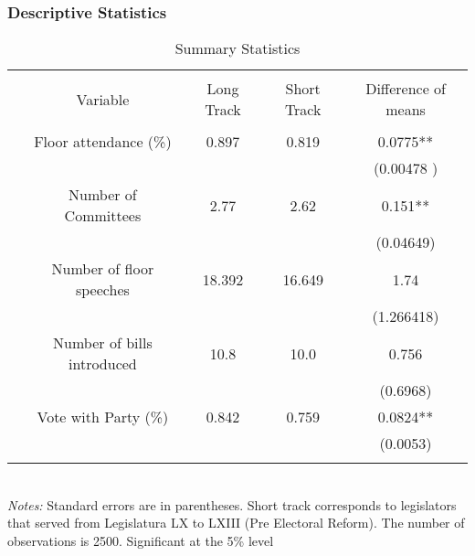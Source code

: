 \documentclass{article}
\begin{document}
\subsubsection*{Descriptive Statistics}
\begin{table}[!htbp] \centering 
	\caption{Summary Statistics}
	\begin{tabular}{@{\extracolsep{4pt}} ccccc} 
		\\[-1.8ex]\hline 
		\hline \\[-1.8ex] 
		& Variable & Long Track  & Short Track & Difference of means  \\ 
		\hline \\[-1.8ex] 
		& Floor attendance (\%) & 0.897  & 0.819 &  0.0775** \\ 
		& &   &  &  (0.00478 ) \\ 
		& Number of Committees   &  2.77   &2.62 &  0.151**  \\ 
		& &   &  & (0.04649)  \\ 
		& Number of floor speeches   &  18.392 &16.649  &  1.74 \\ 
		& &   &  &  (1.266418) \\ 
		& Number of bills introduced  &  10.8  & 10.0 &  0.756 \\ 
		& &   &  & (0.6968)  \\ 
		& Vote with Party (\%)   &  0.842  & 0.759   &  0.0824** \\ 
		& &   &  &   (0.0053)\\ 
		\hline \\[-1.8ex] 
	\end{tabular} 
	\\
	\textit{Notes:} Standard errors are in parentheses. Short track corresponds to legislators that served from Legislatura LX to LXIII (Pre Electoral Reform). The number of observations is 2500. Significant at the 5\% level 
\end{table} 
\end{document}
